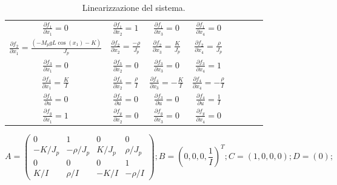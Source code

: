 \documentclass[a4paper]{article}
\begin{document}
{\begin{table}[h]

\centering

    \begin{tabular}{| Sc | Sc | Sc | Sc |}

\(\displaystyle \frac{\partial f_1}{\partial x_1} = 0 \) &
\(\displaystyle \frac{\partial f_1}{\partial x_2} = 1\) &
\(\displaystyle \frac{\partial f_1}{\partial x_3} = 0\) &
\(\displaystyle \frac{\partial f_1}{\partial x_4} = 0 \)\\
\(\displaystyle \frac{\partial f_2}{\partial x_1} = \frac{(-M_p g L \cos(x_1) - K)}{J_p}\) &
\(\displaystyle \frac{\partial f_2}{\partial x_2} = \frac{-\rho}{J_p}\) &
\(\displaystyle \frac{\partial f_2}{\partial x_3} = \frac{K}{J_p}\) &
\(\displaystyle \frac{\partial f_2}{\partial x_4} = \frac{\rho}{J_p} \)\\
\(\displaystyle \frac{\partial f_3}{\partial x_1} = 0\) &
\(\displaystyle \frac{\partial f_3}{\partial x_2} = 0\) &
\(\displaystyle \frac{\partial f_3}{\partial x_3} = 0\) &
\(\displaystyle \frac{\partial f_3}{\partial x_4} = 1 \)\\
\(\displaystyle \frac{\partial f_4}{\partial x_1} = \frac{K}{I}\) &
\(\displaystyle \frac{\partial f_4}{\partial x_2} = \frac{\rho}{I}\) &
\(\displaystyle \frac{\partial f_4}{\partial x_3} = -\frac{K}{I}\) &
\(\displaystyle \frac{\partial f_4}{\partial x_4} = -\frac{\rho}{I} \)\\
\(\displaystyle \frac{\partial f_1}{\partial u} = 0\) &
\(\displaystyle \frac{\partial f_2}{\partial u} = 0\) &
\(\displaystyle \frac{\partial f_3}{\partial u} = 0\) &
\(\displaystyle \frac{\partial f_4}{\partial u} = \frac{1}{I} \)\\
\(\displaystyle \frac{\partial f_y}{\partial x_1} = 1\) &
\(\displaystyle \frac{\partial f_y}{\partial x_2} = 0\) &
\(\displaystyle \frac{\partial f_y}{\partial x_3} = 0\) &
\(\displaystyle \frac{\partial f_y}{\partial x_4} = 0 \)
\end{tabular}
\caption{Linearizzazione del sistema.}
\label{table:linearization_calc}
\end{table}}

\begin{equation}
    \label{eqn:linearization}
A = \begin{pmatrix}0 & 1 & 0 & 0 \\
    -K/J_p & -\rho/J_p & K/J_p & \rho/J_p \\
    0    &   0    &   0    &   1\\
    K/I  & \rho/I & -K/I &-\rho/I
\end{pmatrix};
B = (0, 0, 0, \frac{1}{I})^T;
C = (1, 0, 0, 0);
D = (0);
\end{equation}
\end{document}
